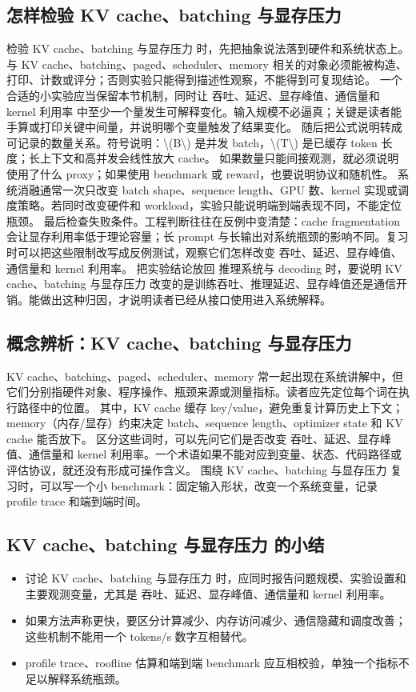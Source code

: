 \documentclass[a4paper]{article}
\begin{document}
\subsection{怎样检验 KV cache、batching 与显存压力}
检验 KV cache、batching 与显存压力 时，先把抽象说法落到硬件和系统状态上。与 KV cache、batching、paged、scheduler、memory 相关的对象必须能被构造、打印、计数或评分；否则实验只能得到描述性观察，不能得到可复现结论。
一个合适的小实验应当保留本节机制，同时让 吞吐、延迟、显存峰值、通信量和 kernel 利用率 中至少一个量发生可解释变化。输入规模不必逼真；关键是读者能手算或打印关键中间量，并说明哪个变量触发了结果变化。
随后把公式说明转成可记录的数量关系。符号说明：\textbackslash{}(B\textbackslash{}) 是并发 batch，\textbackslash{}(T\textbackslash{}) 是已缓存 token 长度；长上下文和高并发会线性放大 cache。 如果数量只能间接观测，就必须说明使用了什么 proxy；如果使用 benchmark 或 reward，也要说明协议和随机性。
系统消融通常一次只改变 batch shape、sequence length、GPU 数、kernel 实现或调度策略。若同时改变硬件和 workload，实验只能说明端到端表现不同，不能定位瓶颈。
最后检查失败条件。工程判断往往在反例中变清楚：cache fragmentation 会让显存利用率低于理论容量；长 prompt 与长输出对系统瓶颈的影响不同。复习时可以把这些限制改写成反例测试，观察它们怎样改变 吞吐、延迟、显存峰值、通信量和 kernel 利用率。
把实验结论放回 推理系统与 decoding 时，要说明 KV cache、batching 与显存压力 改变的是训练吞吐、推理延迟、显存峰值还是通信开销。能做出这种归因，才说明读者已经从接口使用进入系统解释。
\subsection{概念辨析：KV cache、batching 与显存压力}
KV cache、batching、paged、scheduler、memory 常一起出现在系统讲解中，但它们分别指硬件对象、程序操作、瓶颈来源或测量指标。读者应先定位每个词在执行路径中的位置。
其中，KV cache 缓存 key/value，避免重复计算历史上下文；memory（内存/显存）约束决定 batch、sequence length、optimizer state 和 KV cache 能否放下。
区分这些词时，可以先问它们是否改变 吞吐、延迟、显存峰值、通信量和 kernel 利用率。一个术语如果不能对应到变量、状态、代码路径或评估协议，就还没有形成可操作含义。
围绕 KV cache、batching 与显存压力 复习时，可以写一个小 benchmark：固定输入形状，改变一个系统变量，记录 profile trace 和端到端时间。
\subsection{KV cache、batching 与显存压力 的小结}
\begin{itemize}
\item 讨论 KV cache、batching 与显存压力 时，应同时报告问题规模、实验设置和主要观测变量，尤其是 吞吐、延迟、显存峰值、通信量和 kernel 利用率。
\item 如果方法声称更快，要区分计算减少、内存访问减少、通信隐藏和调度改善；这些机制不能用一个 tokens/s 数字互相替代。
\item profile trace、roofline 估算和端到端 benchmark 应互相校验，单独一个指标不足以解释系统瓶颈。
\end{itemize}
\end{document}
